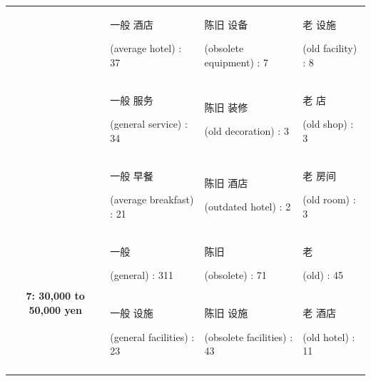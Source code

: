 \documentclass[smallextended,natbib]{svjour3}       %
\begin{document}
\begin{landscape}
\begin{table}[p]
{\begin{tabular}{|c|l|l|l|}
         &
          \begin{CJK}{UTF8}{gbsn}一般 酒店\end{CJK} (average hotel) : 37 &
          \begin{CJK}{UTF8}{gbsn}陈旧 设备\end{CJK} (obsolete equipment) : 7 &
          \begin{CJK}{UTF8}{gbsn}老 设施\end{CJK} (old facility) : 8 \\
         &
          \begin{CJK}{UTF8}{gbsn}一般 服务\end{CJK} (general service) : 34 &
          \begin{CJK}{UTF8}{gbsn}陈旧 装修\end{CJK} (old decoration) : 3 &
          \begin{CJK}{UTF8}{gbsn}老 店\end{CJK} (old shop) : 3 \\
         &
          \begin{CJK}{UTF8}{gbsn}一般 早餐\end{CJK} (average breakfast) : 21 &
          \begin{CJK}{UTF8}{gbsn}陈旧 酒店\end{CJK} (outdated hotel) : 2 &
          \begin{CJK}{UTF8}{gbsn}老 房间\end{CJK} (old room) : 3 \\ \hline
        \multirow{5}{*}{\textbf{7: 30,000 to 50,000 yen}} &
          \begin{CJK}{UTF8}{gbsn}一般\end{CJK} (general) : 311 &
          \begin{CJK}{UTF8}{gbsn}陈旧\end{CJK} (obsolete) : 71 &
          \begin{CJK}{UTF8}{gbsn}老\end{CJK} (old) : 45 \\
         &
          \begin{CJK}{UTF8}{gbsn}一般 设施\end{CJK} (general facilities) : 23 &
          \begin{CJK}{UTF8}{gbsn}陈旧 设施\end{CJK} (obsolete facilities) : 43 &
          \begin{CJK}{UTF8}{gbsn}老 酒店\end{CJK} (old hotel) : 11 \\
         &

\end{tabular}}
\end{table}
\end{landscape}
\end{document}
